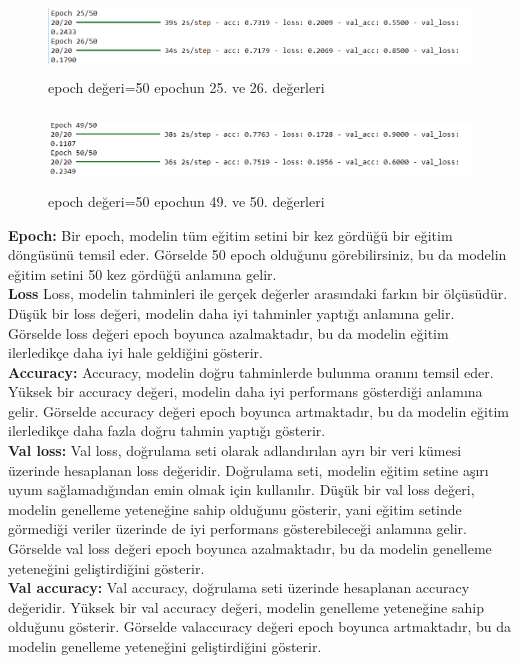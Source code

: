\documentclass[12pt, a4paper]{article}
\begin{document}
	\begin{figure}[h]
		\centering
		\includegraphics[width=12cm,height=2cm]{epoch2.png}
		\caption{epoch değeri=50 epochun 25. ve 26. değerleri}
		\label{epoch2}
	\end{figure}
	
	\begin{figure}[h]
		\centering
		\includegraphics[width=12cm,height=2cm]{epoch3.png}
		\caption{epoch değeri=50 epochun 49. ve 50. değerleri}
		\label{epoch3}
	\end{figure}
	\newpage
	\textbf{Epoch:} Bir epoch, modelin tüm eğitim setini bir kez gördüğü bir eğitim döngüsünü temsil eder. Görselde 50 epoch olduğunu görebilirsiniz, bu da modelin eğitim setini 50 kez gördüğü anlamına gelir.\\
	\textbf{Loss} Loss, modelin tahminleri ile gerçek değerler arasındaki farkın bir ölçüsüdür. Düşük bir loss değeri, modelin daha iyi tahminler yaptığı anlamına gelir. Görselde loss değeri epoch boyunca azalmaktadır, bu da modelin eğitim ilerledikçe daha iyi hale geldiğini gösterir.\\
	\textbf{Accuracy:} Accuracy, modelin doğru tahminlerde bulunma oranını temsil eder. Yüksek bir accuracy değeri, modelin daha iyi performans gösterdiği anlamına gelir. Görselde accuracy değeri epoch boyunca artmaktadır, bu da modelin eğitim ilerledikçe daha fazla doğru tahmin yaptığı gösterir.\\
	\textbf{Val loss:} Val loss, doğrulama seti olarak adlandırılan ayrı bir veri kümesi üzerinde hesaplanan loss değeridir. Doğrulama seti, modelin eğitim setine aşırı uyum sağlamadığından emin olmak için kullanılır. Düşük bir val loss değeri, modelin genelleme yeteneğine sahip olduğunu gösterir, yani eğitim setinde görmediği veriler üzerinde de iyi performans gösterebileceği anlamına gelir. Görselde val loss değeri epoch boyunca azalmaktadır, bu da modelin genelleme yeteneğini geliştirdiğini gösterir.\\
	\textbf{Val accuracy:} Val accuracy, doğrulama seti üzerinde hesaplanan accuracy değeridir. Yüksek bir val accuracy değeri, modelin genelleme yeteneğine sahip olduğunu gösterir. Görselde valaccuracy değeri epoch boyunca artmaktadır, bu da modelin genelleme yeteneğini geliştirdiğini gösterir.
	
\end{document}
